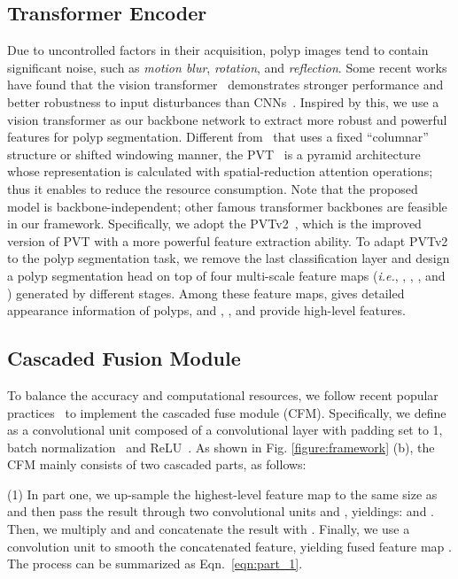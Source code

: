 \documentclass[journal]{IEEEtran}
\begin{document}
\subsection{Transformer Encoder}\label{subsec:Transformer Encoder}
Due to uncontrolled factors in their acquisition, polyp images tend to contain significant noise, such as \textit{motion blur}, \textit{rotation}, and \textit{reflection}.
Some recent works~\cite{bhojanapalli2021understanding,xie2021segformer} have found that the vision transformer~\cite{dosovitskiy2020image,wang2021pyramid,wang2021pvtv2} demonstrates stronger performance and better robustness to input disturbances than CNNs~\cite{simonyan2015very,he2016deep}.
Inspired by this, we use a vision transformer as our backbone network to extract more robust and powerful features for polyp segmentation. 
Different from~\cite{liu2021swin,dosovitskiy2020image} that uses a fixed ``columnar'' structure or shifted windowing manner, the PVT~\cite{wang2021pyramid} is a pyramid architecture whose representation is calculated with spatial-reduction attention operations; thus it enables to reduce the resource consumption.
Note that the proposed model is backbone-independent; other famous transformer backbones are feasible in our framework. Specifically, we adopt the PVTv2~\cite{wang2021pvtv2}, which is the improved version of PVT with a more powerful feature extraction ability.
To adapt PVTv2 to the polyp segmentation task, we remove the last classification layer and design a polyp segmentation head on top of four multi-scale feature maps (\emph{i.e.}, , , , and ) generated by different stages. 
Among these feature maps,  gives detailed appearance information of polyps, and , , and  provide high-level features.


\subsection{Cascaded Fusion Module}\label{subsec:cascaded fusion}
To balance the accuracy and computational resources, we follow recent popular practices~\cite{Wu_2019_CVPR,fan2020pranet} to implement the cascaded fuse module (CFM). 
Specifically, we define  as a convolutional unit composed of a  convolutional layer with padding set to 1, batch normalization~\cite{ioffe2015batch} and ReLU~\cite{glorot2011deep}.
As shown in Fig. \ref{figure:framework} (b), the CFM mainly consists of two cascaded parts, as follows:

(1) In part one,
we up-sample the highest-level feature map  to the same size as  and then pass the result through two convolutional units { and }, yieldings:  and .
Then, we multiply  and  and concatenate the result with .
Finally, we use a convolution unit  to smooth the concatenated feature, yielding fused feature map .
The process can be summarized as Eqn.~\ref{eqn:part_1}.
\end{document}
